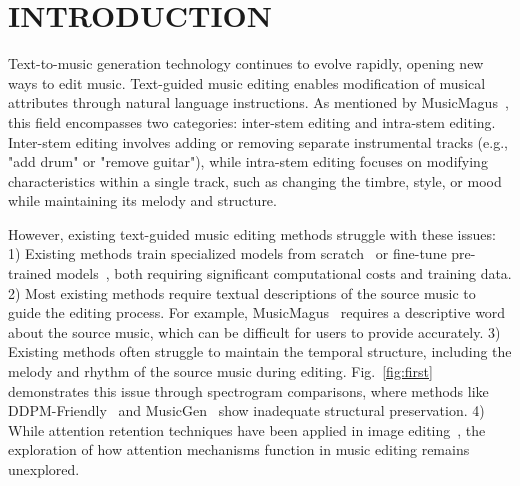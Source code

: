 \section{INTRODUCTION}

Text-to-music generation technology continues to evolve rapidly, opening new ways to edit music. Text-guided music editing enables modification of musical attributes through natural language instructions. As mentioned by MusicMagus~\cite{magus}, this field encompasses two categories: inter-stem editing and intra-stem editing. Inter-stem editing involves adding or removing separate instrumental tracks (e.g., "add drum" or "remove guitar"), while intra-stem editing focuses on modifying characteristics within a single track, such as changing the timbre, style, or mood while maintaining its melody and structure.

However, existing text-guided music editing methods struggle with these issues: 1) Existing methods train specialized models from scratch~\cite{agostinelli2023musiclm,musicgen} or fine-tune pre-trained models~\cite{ruiz2023dreambooth,zhang2024instructmusicgen}, both requiring significant computational costs and training data. 2) Most existing methods require textual descriptions of the source music to guide the editing process. For example, MusicMagus~\cite{magus} requires a descriptive word about the source music, which can be difficult for users to provide accurately. 3) Existing methods often struggle to maintain the temporal structure, including the melody and rhythm of the source music during editing. Fig.~\ref{fig:first} demonstrates this issue through spectrogram comparisons, where methods like DDPM-Friendly~\cite{manor2024ddpm} and MusicGen~\cite{musicgen} show inadequate structural preservation. 4) While attention retention techniques have been applied in image editing~\cite{p2p,cao2023masactrl}, the exploration of how attention mechanisms function in music editing remains unexplored.

